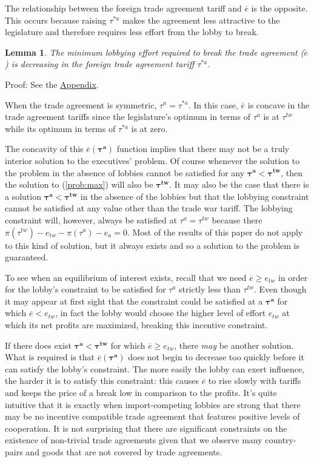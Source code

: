 \documentclass[authoryear, review]{elsarticle}
\newtheorem{lemma}{Lemma}
\newcommand{\ov}{\overline}
\newcommand{\bta}{\bm{\tau^a}}
\newcommand{\btw}{\bm{\tau^{tw}}}
\begin{document}
The relationship between the foreign trade agreement tariff and $\ov{e}$ is the opposite. This occurs because raising $\tau^{*a}$ makes the agreement less attractive to the legislature and therefore requires less effort from the lobby to break.
\begin{lemma}
  The minimum lobbying effort required to break the trade agreement ($\ov{e}$) is decreasing in the foreign trade agreement tariff $\tau^{*a}$.
  \label{lem:ets}
\end{lemma}
Proof: See the \hyperlink{Lem_ets}{Appendix}.

When the trade agreement is symmetric, $\tau^a = \tau^{*a}$. In this case, $\ov{e}$ is concave in the trade agreement tariffs since the legislature's optimum in terms of $\tau^a$ is at $\tau^{tw}$ while its optimum in terms of $\tau^{*a}$ is at zero.

The concavity of this $\ov{e}(\bta)$ function implies that there may not be a truly interior solution to the executives' problem. Of course whenever the solution to the problem in the absence of lobbies cannot be satisfied for any $\bta < \btw$, then the solution to (\ref{prob:max}) will also be $\btw$. It may also be the case that there is a solution $\bta < \btw$ in the absence of the lobbies but that the lobbying constraint cannot be satisfied at any value other than the trade war tariff. The lobbying constraint will, however, always be satisfied at $\tau^a = \tau^{tw}$ because there $\pi(\tau^{tw}) -e_{tw} - \pi(\tau^a) - e_a =0$. Most of the results of this paper do not apply to this kind of solution, but it always exists and so a solution to the problem is guaranteed.

To see when an equilibrium of interest exists, recall that we need $\ov{e} \geq e_{tw}$ in order for the lobby's constraint to be  satisfied for $\tau^a$ strictly less than $\tau^{tw}$. Even though it may appear at first sight that the constraint could be satisfied at a $\bta$ for which $\ov{e} < e_{tw}$, in fact the lobby would choose the higher level of effort $e_{tw}$ at which its net profits are maximized, breaking this incentive constraint. 

If there does exist $\bta < \btw$ for which $\ov{e} \geq e_{tw}$, there \textit{may} be another solution. What is required is that $\ov{e}(\bta)$ does not begin to decrease too quickly before it can satisfy the lobby's constraint. The more easily the lobby can exert influence, the harder it is to satisfy this constraint: this causes $\ov{e}$ to rise slowly with tariffs and keeps the price of a break low in comparison to the profits. It's quite intuitive that it is exactly when import-competing lobbies are strong that there may be no incentive compatible trade agreement that features positive levels of cooperation. It is not surprising that there are significant constraints on the existence of non-trivial trade agreements given that we observe many country-pairs and goods that are not covered by trade agreements.
\end{document}
